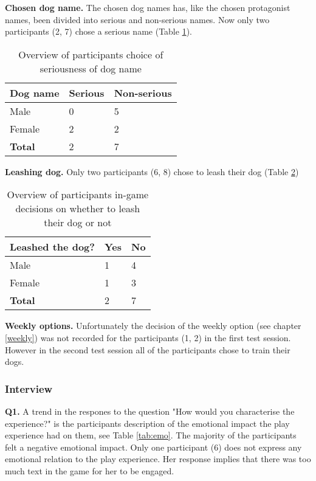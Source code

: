 \textbf{Chosen dog name.} The chosen dog names has, like the chosen protagonist names, been divided into serious and non-serious names. Now only two participants (2, 7) chose a serious name (Table \ref{tab:dame}). 

\begin{table}[h]
\centering
\begin{tabular}{l l l}
\hline
\textbf{Dog name} & Serious & Non-serious \\
\hline
Male & 0 & 5 \\
Female & 2 & 2 \\
\textbf{Total} & 2 & 7 \\
\hline
\end{tabular}
\caption{\label{tab:dame}Overview of participants choice of seriousness of dog name}
\end{table}


\textbf{Leashing dog.} Only two participants (6, 8) chose to leash their dog (Table \ref{tab:leas})

\begin{table}[h]
\centering
\begin{tabular}{l l l}
\hline
\textbf{Leashed the dog?} & Yes & No \\
\hline
Male & 1 & 4 \\
Female & 1 & 3 \\
\textbf{Total} & 2 & 7 \\
\hline
\end{tabular}
\caption{\label{tab:leas}Overview of participants in-game decisions on whether to leash their dog or not}
\end{table}


\textbf{Weekly options.} Unfortunately the decision of the weekly option (see chapter \ref{weekly}) was not recorded for the participants (1, 2) in the first test session. However in the second test session all of the participants chose to train their dogs.


\subsubsection{Interview} \label{interview}
\textbf{Q1.} A trend in the respones to the question "How would you characterise the experience?" is the participants description of the emotional impact the play experience had on them, see Table \ref{tab:emo}. The majority of the participants felt a negative emotional impact. Only one participant (6) does not express any emotional relation to the play experience. Her response implies that there was too much text in the game for her to be engaged.

